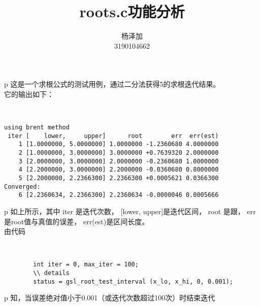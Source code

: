 \documentclass{ctexart}
\title{roots.c功能分析}
\author{杨泽加 \\ 3190104662}
\begin{document}
    \maketitle

    \begin{tabular}{p\columnwidth}
        这是一个求根公式的测试用例，通过二分法获得5的求根迭代结果。\\
        它的输出如下：
    \end{tabular}\\
    \begin{lstlisting}
using brent method
 iter [    lower,     upper]      root        err  err(est)
    1 [1.0000000, 5.0000000] 1.0000000 -1.2360680 4.0000000
    2 [1.0000000, 3.0000000] 3.0000000 +0.7639320 2.0000000
    3 [2.0000000, 3.0000000] 2.0000000 -0.2360680 1.0000000
    4 [2.2000000, 3.0000000] 2.2000000 -0.0360680 0.8000000
    5 [2.2000000, 2.2366300] 2.2366300 +0.0005621 0.0366300
Converged:
    6 [2.2360634, 2.2366300] 2.2360634 -0.0000046 0.0005666
    \end{lstlisting}
    \begin{tabular}{p\columnwidth}
        如上所示，其中 iter 是迭代次数， [lower, upper]是迭代区间，
        root 是跟， err 是root值与真值的误差， err(est)是区间长度。\\
        由代码
    \end{tabular}\\
    \begin{lstlisting}
        int iter = 0, max_iter = 100;
        \\ details
        status = gsl_root_test_interval (x_lo, x_hi, 0, 0.001);
    \end{lstlisting}
    \begin{tabular}{p\columnwidth}
        知，当误差绝对值小于0.001（或迭代次数超过100次）时结束迭代
    \end{tabular}
\end{document}
